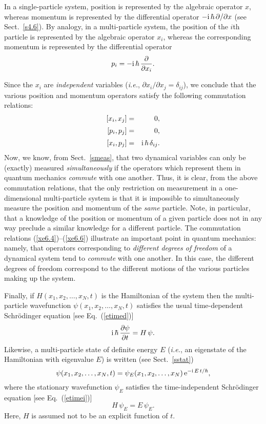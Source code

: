 In a single-particle system, position is represented by the algebraic operator $x$,
whereas momentum is represented by the differential operator
$-{\rm i}\,\hbar\,\partial/\partial x$ (see Sect.~\ref{s4.6}). By analogy,
in a multi-particle system, the position of the $i$th particle
is represented by the algebraic operator $x_i$, whereas the corresponding
momentum is represented by the differential operator
\begin{equation}\label{ex3}
p_i = - {\rm i}\,\hbar\,\frac{\partial}{\partial x_i}.
\end{equation}

Since the $x_i$ are {\em independent}\/ variables ({\em i.e.},
$\partial x_i/\partial x_j=\delta_{ij}$), we conclude that the
various position and momentum operators satisfy the following commutation
relations:
\begin{eqnarray}\label{xe6.4}
[x_i,x_j] &=& 0,\\[0.5ex]
[p_i,p_j] &=& 0,\\[0.5ex]
[x_i,p_j] &=& {\rm i}\,\hbar\,\delta_{ij}.\label{xe6.6}
\end{eqnarray}
Now, we know, from Sect.~\ref{smeas}, that two dynamical variables
can only be (exactly) measured {\em simultaneously}\/ if the operators which represent
them in quantum mechanics {\em commute}\/ with one another. Thus,
it is clear, from the above commutation relations, that the only restriction
on measurement in a one-dimensional multi-particle system is that it is impossible to
simultaneously measure the position and momentum of the {\em same}\/
particle. Note, in particular, that a knowledge of the position or momentum of a given
particle does not in any way preclude a similar knowledge for a different
particle. The commutation relations (\ref{xe6.4})--(\ref{xe6.6}) illustrate
an important point in quantum mechanics: namely, that operators corresponding to {\em different degrees
of freedom}\/ of a dynamical system tend to {\em commute}\/ with one another.
In this case, the different degrees of freedom correspond to the different
motions of the various particles making up the system.

Finally, if $H(x_1,x_2,\ldots, x_N,t)$ is the Hamiltonian of the system then
the multi-particle wavefunction $\psi(x_1,x_2,\ldots,x_N,t)$ satisfies
the usual time-dependent Schr\"{o}\-dinger equation [see Eq.~(\ref{etimed})]
\begin{equation}\label{ex7}
{\rm i}\,\hbar\,\frac{\partial\psi}{\partial t} = H\,\psi.
\end{equation}
Likewise, a multi-particle state of definite energy $E$ ({\em i.e.}, an
eigenstate of the Hamiltonian with eigenvalue $E$) is written (see Sect.~\ref{sstat})
\begin{equation}
\psi(x_1,x_2,\ldots, x_N,t)  = \psi_E(x_1,x_2,\ldots, x_N)\,{\rm e}^{-{\rm i}\,E\,t/\hbar},
\end{equation}
where the stationary wavefunction $\psi_E$ satisfies the time-independent
Schr\"{o}d\-inger equation [see Eq.~(\ref{etimei})]
\begin{equation}\label{ex9}
H\,\psi_E = E\,\psi_E.
\end{equation}
Here, $H$ is assumed not to be an explicit function of $t$.


